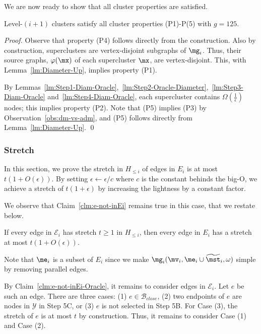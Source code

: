 We are now ready to show that all cluster properties are satisfied. 

\begin{lemma} Level-$(i+1)$ clusters satisfy all cluster properties (P1)-P(5) with $g = 125$.
\end{lemma}
\begin{proof}
	Observe that property (P4) follows directly from the construction. Also by construction, superclusters are vertex-disjoint subgraphs of $\mg_i$. Thus, their source graphs, $\varphi(\mx)$ of each supercluster $\mx$, are vertex-disjoint.  This, with Lemma~\ref{lm:Diameter-Up}, implies property (P1). 	
	
	By Lemmas~\ref{lm:Step1-Diam-Oracle},~\ref{lm:Step2-Oracle-Diameter},~\ref{lm:Step3-Diam-Oracle} and~\ref{lm:Step4-Diam-Oracle}, each supercluster contains $\Omega(\frac{1}{\epsilon})$ nodes; this implies property (P2). Note that (P5) implies (P3) by Observation~\ref{obs:dm-vs-adm}, and (P5) follows directly from Lemma~\ref{lm:Diameter-Up}. \qed
\end{proof}

\subsubsection{Stretch}\label{subsec:StretchOracle}



In this section, we prove the stretch in $H_{\leq i}$ of edges in $E_i$ is at most $t(1+O(\epsilon))$. By setting $\epsilon \leftarrow \epsilon/c$ where $c$ is the constant behinds the big-O, we achieve a stretch of $t(1+\epsilon)$ by increasing the lightness by a   constant factor.  


We observe that Claim~\ref{clm:e-not-inEi} remains true in this case, that we restate below.

\begin{claim}\label{clm:e-not-inEi-Oracle} If every edge in $\mathcal{E}_i$ has stretch $t\geq 1$ in $H_{\leq i}$, then every edge in $E_i$ has a stretch at most $t(1+O(\epsilon))$.
\end{claim}

Note that $\me_i$ is a subset of $E_i$ since we make $\mg_i(\mv_i,\me_i\cup\widetilde{\mst}_i,\omega)$ simple by removing parallel edges.

By Claim~\ref{clm:e-not-inEi-Oracle}, it remains to consider edges in $\mathcal{E}_i$. Let $e$ be such an edge. There are three cases: (1) $e \in \mathcal{B}_{close}$, (2) two endpoints of $e$ are nodes in $\mathcal{Y}$ in Step 5C,  or (3) $e$ is not selected in Step 5B. For Case (3), the stretch of $e$ is at most $t$ by construction. Thus, it remains to consider Case (1) and Case (2).

